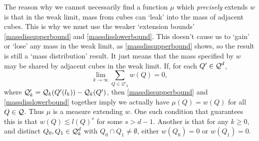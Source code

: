 \begin{remark}
	The reason why we cannot necessarily find a function $\mu$ which \emph{precisely} extends $w$ is that in the weak limit, mass from cubes can `leak' into the mass of adjacent cubes. This is why we must use the weaker `extension bounds' \eqref{massdissupperbound} and \eqref{massdisslowerbound}. This doesn't cause us to `gain' or `lose' any mass in the weak limit, as \eqref{massdissupperbound} shows, so the result is still a `mass distribution' result. It just means that the mass specified by $w$ may be shared by adjacent cubes in the weak limit. If, for each $Q' \in \operatorname{\mathcal{Q}}^d$,
	\[ \lim_{k \to \infty} \sum_{Q \in \mathcal{Q}'_k} w(Q) = 0, \]
	where $\mathcal{Q}'_k = \operatorname{\mathcal{Q}}_k(Q'(l_k)) - \operatorname{\mathcal{Q}}_k(Q')$, then \eqref{massdissupperbound} and \eqref{massdisslowerbound} together imply we actually have $\mu(Q) = w(Q)$ for all $Q \in \operatorname{\mathcal{Q}}$. Thus $\mu$ is a measure extending $w$. One such condition that guarantees this is that $w(Q) \lesssim l(Q)^s$ for some $s > d-1$. Another is that for any $k \geq 0$, and distinct $Q_0, Q_1 \in \operatorname{\mathcal{Q}}_k^d$ with $Q_0 \cap Q_1 \neq \emptyset$, either $w(Q_0) = 0$ or $w(Q_1) = 0$.
\end{remark}


